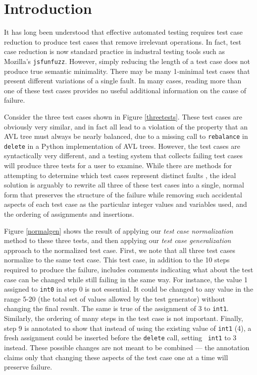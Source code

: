 \section{Introduction}

It has long been understood that effective automated testing requires
test case reduction \cite{DD,MinUnit,ICSEDiff} to produce test cases
that remove irrelevant operations.  In fact, test case reduction is
now standard practice in industral testing tools such as Mozilla's
{\tt jsfunfuzz}.  However, simply reducing the length of a test case
does not produce true semantic minimality.  There may be many
1-minimal test cases that present different variations of a single
fault.  In many cases, reading more than one of these test cases
provides no useful additional information on the cause of failure.

Consider the three test cases shown in Figure \ref{threetests}.  These
test cases are obviously very similar, and in fact all lead to a
violation of the property that an AVL tree must always be nearly
balanced, due to a missing call to {\tt rebalance} in {\tt delete} in
a Python implementation of AVL trees.  However, the test cases are
syntactically very different, and a testing system that collects
failing test cases will produce three tests for a user to examine.
While there are methods for attempting to determine which test cases
represent distinct faults \cite{PLDI13}, the ideal solution is
arguably to rewrite all three of these test cases into a single,
normal form that preserves the structure of the failure while removing
such accidental aspects of each test case as the particular integer
values and variables used, and the ordering of assignments and
insertions.

Figure \ref{normalgen} shows the result of applying our \emph{test case
  normalization} method to these three tests, and then applying our
\emph{test case generalization} approach to the normalized test case.
First, we note that all three test cases normalize to the same test
case.  This test case, in addition to the 10 steps required to produce
the failure, includes comments indicating what about the test case can
be changed while still failing in the same way.  For instance, the
value 1 assigned to {\tt int0} in step 0 is not essential.  It could
be changed to any value in the range 5-20 (the total set of values
allowed by the test generator) without changing the final result.  The
same is true of the assignment of 3 to {\tt int1}.  Similarly, the
ordering of many steps in the test case is not important.  Finally,
step 9 is annotated to show that instead of using the existing value
of {\tt int1} (4), a fresh assignment could be inserted before the
{\tt delete} call, setting {\tt
  int1} to 3 instead.  These possible
changes are not meant to be combined --- the annotation claims only
that changing these aspects of the test case one at a time will
preserve failure.

